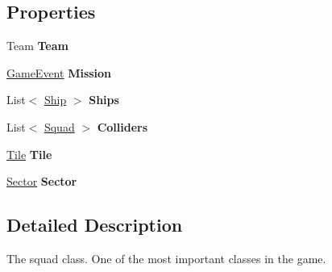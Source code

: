\subsection*{Properties}
\begin{DoxyCompactItemize}
\item 
\hypertarget{class_squad_ac207af75892b4b3a7d5383e7737af654}{}Team {\bfseries Team}\label{class_squad_ac207af75892b4b3a7d5383e7737af654}

\item 
\hypertarget{class_squad_add4ad224a05d0101e4a2ab7116d9417f}{}\hyperlink{class_game_event}{Game\+Event} {\bfseries Mission}\label{class_squad_add4ad224a05d0101e4a2ab7116d9417f}

\item 
\hypertarget{class_squad_a6418ad8fede593e757f2044132a8c9a8}{}List$<$ \hyperlink{class_ship}{Ship} $>$ {\bfseries Ships}\label{class_squad_a6418ad8fede593e757f2044132a8c9a8}

\item 
\hypertarget{class_squad_adfd66d53935cde44eba15c8528d58a3b}{}List$<$ \hyperlink{class_squad}{Squad} $>$ {\bfseries Colliders}\label{class_squad_adfd66d53935cde44eba15c8528d58a3b}

\item 
\hypertarget{class_squad_a3ff00b065284676e4b3d633698b96bc5}{}\hyperlink{class_tile}{Tile} {\bfseries Tile}\label{class_squad_a3ff00b065284676e4b3d633698b96bc5}

\item 
\hypertarget{class_squad_a68e53ea5669095dca8c047d3f2d38e07}{}\hyperlink{class_sector}{Sector} {\bfseries Sector}\label{class_squad_a68e53ea5669095dca8c047d3f2d38e07}

\end{DoxyCompactItemize}


\subsection{Detailed Description}
The squad class. One of the most important classes in the game. 



